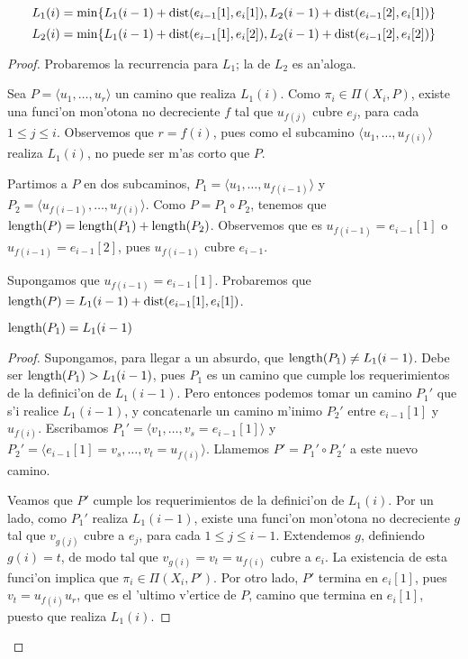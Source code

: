 \begin{theorem}
\label{th:longitud_minima}
\[L_1(i) = \min\{L_1(i - 1) + \textnormal{dist}(e_{i - 1}[1], e_{i}[1]), L_2(i - 1) + \textnormal{dist}(e_{i - 1}[2], e_{i}[1])\}\]
\[L_2(i) = \min\{L_1(i - 1) + \textnormal{dist}(e_{i - 1}[1], e_{i}[2]), L_2(i - 1) + \textnormal{dist}(e_{i - 1}[2], e_{i}[2])\}\]

\begin{proof}
Probaremos la recurrencia para $L_1$; la de $L_2$ es an'aloga.

Sea $P = \langle u_1, \dots, u_r \rangle$ un camino que realiza $L_1(i)$. Como $\pi_i \in \Pi(X_i, P)$, existe una funci'on mon'otona no decreciente $f$ tal que $u_{f(j)}$ cubre $e_j$, para cada $1 \leq j \leq i$. Observemos que $r = f(i)$, pues como el subcamino $\langle u_1, \dots, u_{f(i)} \rangle$ realiza $L_1(i)$, no puede ser m'as corto que $P$.

Partimos a $P$ en dos subcaminos, $P_1 = \langle u_1, \dots, u_{f(i - 1)} \rangle$ y $P_2 = \langle u_{f(i - 1)}, \dots, u_{f(i)} \rangle$. Como $P = P_1 \circ P_2$, tenemos que $\textnormal{length}(P) = \textnormal{length}(P_1) + \textnormal{length}(P_2)$. Observemos que es $u_{f(i - 1)} = e_{i - 1}[1]$ o $u_{f(i - 1)} = e_{i - 1}[2]$, pues $u_{f(i - 1)}$ cubre $e_{i - 1}$.

Supongamos que $u_{f(i - 1)} = e_{i - 1}[1]$. Probaremos que $\textnormal{length}(P) = L_1(i - 1) + \textnormal{dist}(e_{i - 1}[1], e_{i}[1])$.

\begin{claim}
$\textnormal{length}(P_1) = L_1(i - 1)$

\begin{proof}
Supongamos, para llegar a un absurdo, que $\textnormal{length}(P_1) \neq L_1(i - 1)$. Debe ser $\textnormal{length}(P_1) > L_1(i - 1)$, pues $P_1$ es un camino que cumple los requerimientos de la definici'on de $L_1(i - 1)$. Pero entonces podemos tomar un camino $P_1'$ que s'i realice $L_1(i - 1)$, y concatenarle un camino m'inimo $P_2'$ entre $e_{i - 1}[1]$ y $u_{f(i)}$. Escribamos $P_1' = \langle v_1, \dots, v_s = e_{i - 1}[1] \rangle$ y $P_2' = \langle e_{i - 1}[1] = v_s, \dots, v_t = u_{f(i)}\rangle$. Llamemos $P' = P_1' \circ P_2'$ a este nuevo camino. 

Veamos que $P'$ cumple los requerimientos de la definici'on de $L_1(i)$. Por un lado, como $P_1'$ realiza $L_1(i - 1)$, existe una funci'on mon'otona no decreciente $g$ tal que $v_{g(j)}$ cubre a $e_j$, para cada $1 \leq j \leq i - 1$. Extendemos $g$, definiendo $g(i) = t$, de modo tal que $v_{g(i)} = v_t = u_{f(i)}$ cubre a $e_i$. La existencia de esta funci'on implica que $\pi_i \in \Pi(X_i, P')$. Por otro lado, $P'$ termina en $e_{i}[1]$, pues $v_t = u_{f(i)} u_r$, que es el 'ultimo v'ertice de $P$, camino que termina en $e_{i}[1]$, puesto que realiza $L_1(i)$.


\end{proof}
\end{claim}
\end{proof}
\end{theorem}
